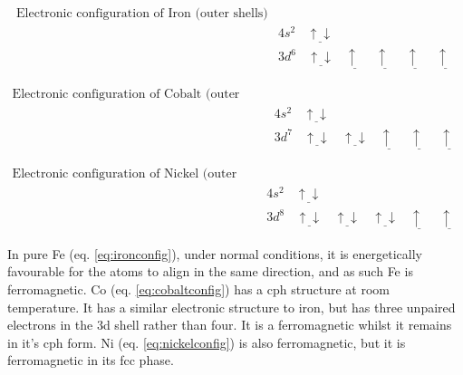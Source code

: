 \begin{equation}
\begin{split}
\text{Electronic configuration of Iron (outer shells)}\\
&4s^2 \:\:\:\:  \underline{\uparrow \downarrow} \\
&3d^6 \:\:\:\:  \underline{\uparrow \downarrow} \:\:\:\:  \underline{\uparrow \:\:} \:\:\:\:  \underline{\uparrow \:\:} \:\:\:\: \underline{\uparrow \:\:} \:\:\:\: \underline{\uparrow \:\:}
\end{split}
\label{eq:ironconfig}
\end{equation}

\begin{equation}
\begin{split}
\text{Electronic configuration of Cobalt (outer shells)}\\
&4s^2 \:\:\:\:  \underline{\uparrow \downarrow} \\
&3d^7 \:\:\:\:  \underline{\uparrow \downarrow} \:\:\:\:  \underline{\uparrow  \downarrow} \:\:\:\:  \underline{\uparrow \:\:} \:\:\:\: \underline{\uparrow \:\:} \:\:\:\: \underline{\uparrow \:\:}
\end{split}
\label{eq:cobaltconfig}
\end{equation}

\begin{equation}
\begin{split}
\text{Electronic configuration of Nickel (outer shells)}\\
&4s^2 \:\:\:\:  \underline{\uparrow \downarrow} \\
&3d^8 \:\:\:\:  \underline{\uparrow \downarrow} \:\:\:\:  \underline{\uparrow  \downarrow} \:\:\:\:  \underline{\uparrow  \downarrow} \:\:\:\: \underline{\uparrow \:\:} \:\:\:\: \underline{\uparrow \:\:}
\end{split}
\label{eq:nickelconfig}
\end{equation}

In pure \Gls{Fe} (eq. \ref{eq:ironconfig}), under normal conditions, it is energetically favourable for the atoms to align in the same direction, and as such \Gls{Fe} is ferromagnetic.  \Gls{Co} (eq. \ref{eq:cobaltconfig}) has a \acrlong{cph} structure at room temperature.  It has a similar electronic structure to iron, but has three unpaired electrons in the 3d shell rather than four.  It is a ferromagnetic whilst it remains in it's \acrshort{cph} form.  \Gls{Ni} (eq. \ref{eq:nickelconfig}) is also ferromagnetic, but it is ferromagnetic in its \acrshort{fcc} phase.

